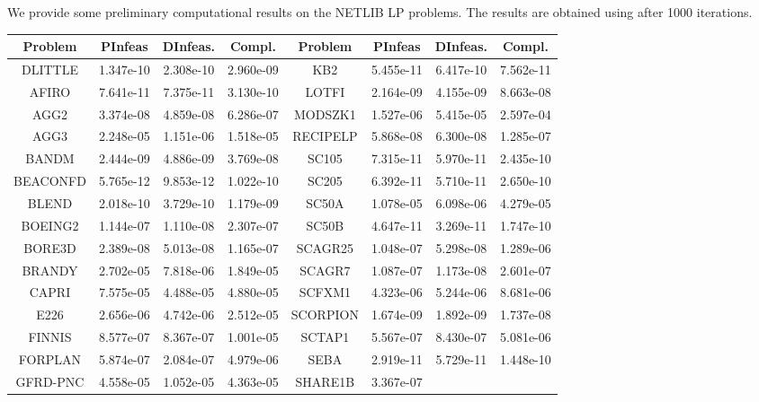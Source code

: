 \documentclass{article}
\newcommand{\tmverbatim}[1]{\text{{\ttfamily{#1}}}}
\newcommand{\0}{\textbf{0}}
\begin{document}
We provide some preliminary computational results on the NETLIB LP problems.
The results are obtained using \tmverbatim{MATLAB} after 1000 iterations.

\begin{table}[h]
  {\small{\begin{tabular}{cccc|c|ccc}
    \hline
    Problem & PInfeas & DInfeas. & Compl. & Problem & PInfeas & DInfeas. &
    Compl.\\
    \hline
    DLITTLE & 1.347e-10 & 2.308e-10 & 2.960e-09 & KB2 & 5.455e-11 & 6.417e-10
    & 7.562e-11\\
    \hline
    AFIRO & 7.641e-11 & 7.375e-11 & 3.130e-10 & LOTFI & 2.164e-09 & 4.155e-09
    & 8.663e-08\\
    \hline
    AGG2 & 3.374e-08 & 4.859e-08 & 6.286e-07 & MODSZK1 & 1.527e-06 & 5.415e-05
    & 2.597e-04\\
    \hline
    AGG3 & 2.248e-05 & 1.151e-06 & 1.518e-05 & RECIPELP & 5.868e-08 &
    6.300e-08 & 1.285e-07\\
    \hline
    BANDM & 2.444e-09 & 4.886e-09 & 3.769e-08 & SC105 & 7.315e-11 & 5.970e-11
    & 2.435e-10\\
    \hline
    BEACONFD & 5.765e-12 & 9.853e-12 & 1.022e-10 & SC205 & 6.392e-11 &
    5.710e-11 & 2.650e-10\\
    \hline
    BLEND & 2.018e-10 & 3.729e-10 & 1.179e-09 & SC50A & 1.078e-05 & 6.098e-06
    & 4.279e-05\\
    \hline
    BOEING2 & 1.144e-07 & 1.110e-08 & 2.307e-07 & SC50B & 4.647e-11 &
    3.269e-11 & 1.747e-10\\
    \hline
    BORE3D & 2.389e-08 & 5.013e-08 & 1.165e-07 & SCAGR25 & 1.048e-07 &
    5.298e-08 & 1.289e-06\\
    \hline
    BRANDY & 2.702e-05 & 7.818e-06 & 1.849e-05 & SCAGR7 & 1.087e-07 &
    1.173e-08 & 2.601e-07\\
    \hline
    CAPRI & 7.575e-05 & 4.488e-05 & 4.880e-05 & SCFXM1 & 4.323e-06 & 5.244e-06
    & 8.681e-06\\
    \hline
    E226 & 2.656e-06 & 4.742e-06 & 2.512e-05 & SCORPION & 1.674e-09 &
    1.892e-09 & 1.737e-08\\
    \hline
    FINNIS & 8.577e-07 & 8.367e-07 & 1.001e-05 & SCTAP1 & 5.567e-07 &
    8.430e-07 & 5.081e-06\\
    \hline
    FORPLAN & 5.874e-07 & 2.084e-07 & 4.979e-06 & SEBA & 2.919e-11 & 5.729e-11
    & 1.448e-10\\
    \hline
    GFRD-PNC & 4.558e-05 & 1.052e-05 & 4.363e-05 & SHARE1B & 3.367e-07 &

\end{tabular}}}
\end{table}
\end{document}
